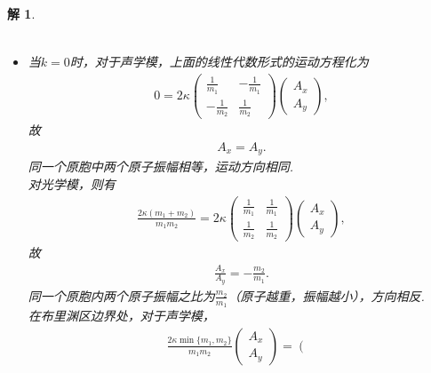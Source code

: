 \documentclass[UTF8,10pt,a4paper]{article}
\theoremstyle{Problem}
\theoremstyle{Solution}
\newtheorem*{sol}{解}
\begin{document}
\begin{sol}
\begin{enumerate}
\begin{align}
        \end{align}
        \begin{itemize}
            \item[$\triangleright$] 当$k=0$时，对于声学模，上面的线性代数形式的运动方程化为
            \begin{align}
                0=2\kappa\left(\begin{matrix}
                    \frac{1}{m_1}&-\frac{1}{m_1}\\
                    -\frac{1}{m_2}&\frac{1}{m_2}
                \end{matrix}\right)\left(\begin{matrix}
                    A_x\\
                    A_y
                \end{matrix}\right),
            \end{align}
            故
            \begin{align}
                A_x=A_y.
            \end{align}
            同一个原胞中两个原子振幅相等，运动方向相同.\\
            对光学模，则有
            \begin{align}
                \frac{2\kappa(m_1+m_2)}{m_1m_2}=2\kappa\left(\begin{matrix}
                    \frac{1}{m_1}&\frac{1}{m_1}\\
                    \frac{1}{m_2}&\frac{1}{m_2}
                \end{matrix}\right)\left(\begin{matrix}
                    A_x\\
                    A_y
                \end{matrix}\right),
            \end{align}
            故
            \begin{align}
                \frac{A_x}{A_y}=-\frac{m_2}{m_1}.
            \end{align}
            同一个原胞内两个原子振幅之比为$\frac{m_2}{m_1}$（原子越重，振幅越小），方向相反.\\
            在布里渊区边界处，对于声学模，
            \begin{align}
                \frac{2\kappa\min\{m_1,m_2\}}{m_1m_2}\left(\begin{matrix}
                    A_x\\
                    A_y
                \end{matrix}\right)=\left(\begin{matrix}

\end{matrix}
\end{align}
\end{itemize}
\end{enumerate}
\end{sol}
\end{document}
